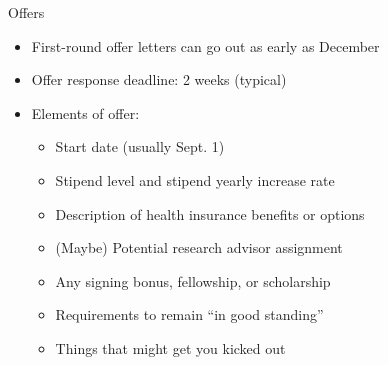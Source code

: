 \begin{frame}[fragile]{Offers}
\begin{itemize}
    \item First-round offer letters can go out as early as December
    \item Offer response deadline: 2 weeks (typical)
    \item Elements of offer:
    \begin{itemize}
        \item Start date (usually Sept. 1)
        \item Stipend level and stipend yearly increase rate
        \item Description of health insurance benefits or options
        \item (Maybe) Potential research advisor assignment
        \item Any signing bonus, fellowship, or scholarship
        \item Requirements to remain ``in good standing''
        \item Things that might get you kicked out
    \end{itemize}
\end{itemize}
\end{frame}

